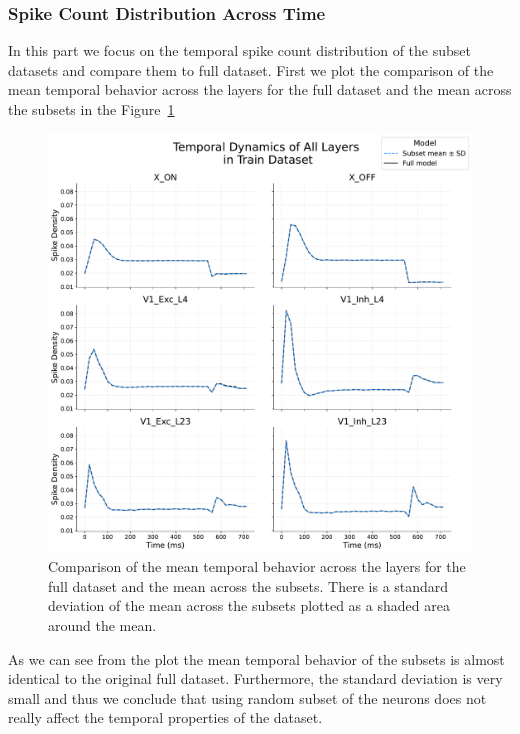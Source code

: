 \subsubsection{Spike Count Distribution Across Time}
\label{subsubsec:spike_time_distribution_subset}
In this part we focus on the temporal spike count distribution of the subset datasets and compare them to full dataset. First we plot the comparison of the mean temporal behavior across the layers for the full dataset and the mean across the subsets in the Figure~\ref{fig:temporal_distribution_subset_vs_full_train}

\begin{figure}
    \centering
    \includegraphics[width=\linewidth]{img/plots/temporal_distribution_subset_vs_full_train.pdf}
    \caption{Comparison of the mean temporal behavior across the layers for the full dataset and the mean across the subsets. There is a standard deviation of the mean across the subsets plotted as a shaded area around the mean.}
    \label{fig:temporal_distribution_subset_vs_full_train}
\end{figure}

As we can see from the plot the mean temporal behavior of the subsets is almost identical to the original full dataset. Furthermore, the standard deviation is very small and thus we conclude that using random subset of the neurons does not really affect the temporal properties of the dataset.